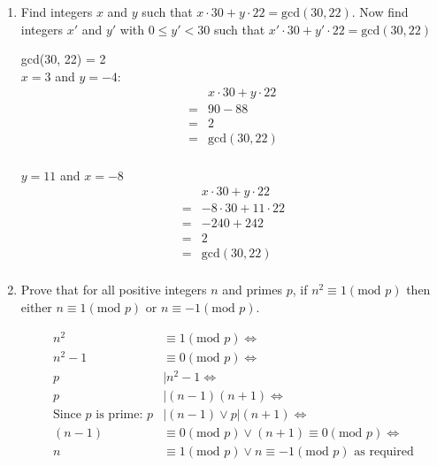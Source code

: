 \documentclass[10pt,\jkfside,a4paper]{article}
\begin{document}
\begin{enumerate}
\item Find integers $x$ and $y$ such that $x\cdot 30 + y\cdot 22 = \text{gcd}(30,22)$. 
Now find integers $x'$ and $y'$ with $0 \leq y' < 30$ such that $x' \cdot 30 + y'\cdot 22 = \text{gcd}(30, 22)$

gcd(30, 22) = 2\\
$x = 3$ and $y = -4$:
\begin{equation}
\begin{split}
 & x \cdot 30 + y \cdot 22\\
=& 90 - 88\\
=& 2\\
=& \text{gcd}(30,22)\\
\end{split}
\end{equation}

$y=11$ and $x = -8$
\begin{equation}
\begin{split}
 & x\cdot 30 + y\cdot 22\\
=& -8 \cdot 30 + 11 \cdot 22\\
=& -240 + 242\\
=& 2\\
=& \text{gcd}(30,22)\\
\end{split}
\end{equation}

\item Prove that for all positive integers $n$ and primes $p$, if $n^2 \equiv 1(\text{mod } p)$ 
then either $n\equiv 1(\text{mod } p)$ or $n\equiv-1(\text{mod } p)$.

\begin{equation}
\begin{split}
n^2 &\equiv 1 (\text{mod } p)\Longleftrightarrow\\
n^2 - 1 &\equiv 0 (\text{mod } p)\Longleftrightarrow\\
p &| n^2 - 1\Longleftrightarrow\\
p &| (n - 1)(n + 1)\Longleftrightarrow\\
\text{Since $p$ is prime: }p &| (n - 1) \vee p | (n + 1)\Longleftrightarrow\\
(n - 1) &\equiv 0 (\text{mod } p) \vee (n + 1) \equiv 0 (\text{mod } p)\Longleftrightarrow\\
n &\equiv 1 (\text{mod } p) \vee n \equiv -1 (\text{mod } p)\text{ as required}\\
\end{split}
\end{equation}

\end{enumerate}
\end{document}
